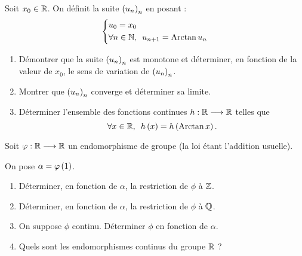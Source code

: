 \begin{corr}
\end{corr}

\begin{exo}
Soit \(x_0\in\mathbb{R}\). On définit la suite \(\left(u_n\right)_n\) en posant : \[\begin{dcases}u_0=x_0 \\ \quantifs{\forall n\in\N}u_{n+1}=\Arctan u_n\end{dcases}\]

\begin{enumerate}
\item Démontrer que la suite \(\left(u_n\right)_n\) est monotone et déterminer, en fonction de la valeur de \(x_0\), le sens de variation de \(\left(u_n\right)_n\). \\

\item Montrer que \(\left(u_n\right)_n\) converge et déterminer sa limite. \\

\item Déterminer l'ensemble des fonctions continues \(h:\mathbb{R}\longrightarrow\mathbb{R}\) telles que \[\quantifs{\forall x\in\R}h\paren{x}=h\paren{\Arctan x}.\]
\end{enumerate}
\end{exo}

\begin{corr}
\end{corr}

\begin{exo}
Soit \(\varphi:\mathbb{R}\longrightarrow\mathbb{R}\) un endomorphisme de groupe (la loi étant l'addition usuelle).

On pose \(\alpha=\varphi\left(1\right)\).

\begin{enumerate}
\item Déterminer, en fonction de \(\alpha\), la restriction de \(\phi\) à \(\mathbb{Z}\). \\

\item Déterminer, en fonction de \(\alpha\), la restriction de \(\phi\) à \(\mathbb{Q}\). \\

\item On suppose \(\phi\) continu. Déterminer \(\phi\) en fonction de \(\alpha\). \\

\item Quels sont les endomorphismes continus du groupe \(\mathbb{R}\) ?
\end{enumerate}
\end{exo}


